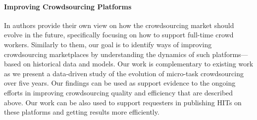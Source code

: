 \paragraph{Improving Crowdsourcing Platforms}
In \cite{Kittur:2013:FCW:2441776.2441923} authors provide their own view on how the crowdsourcing market should evolve in the future, specifically focusing on how to  support full-time crowd workers. Similarly to them, our goal is to identify ways of improving crowdsourcing marketplaces by understanding the dynamics of such platforms---based on historical data and models.
Our work is complementary to existing work as we present a data-driven study of the evolution of micro-task crowdsourcing over five years.
Our findings can be used as support evidence to the ongoing efforts in improving crowdsourcing quality and efficiency that are described above.
Our work can be also used to support requesters in publishing HITs on these platforms and getting results more efficiently.




